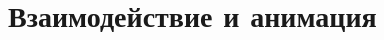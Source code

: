 \documentclass[a4paper,10pt,twoside]{book}
\begin{document}








\section{Взаимодействие и анимация}
\end{document}
